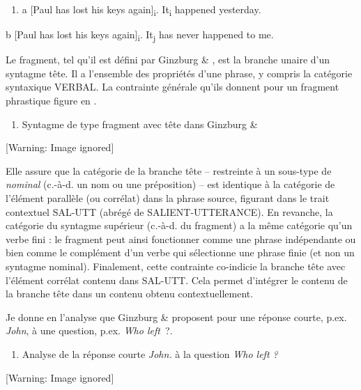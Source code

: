 \begin{enumerate}
\item \label{bkm:Ref290586096}a  [Paul has lost his keys again]\textsubscript{i}. It\textsubscript{i} happened yesterday. 


\end{enumerate}
  b  [Paul has lost his keys again]\textsubscript{i}. It\textsubscript{j} has never happened to me.  

Le fragment, tel qu'il est défini par Ginzburg \& \citet{Sag2000}, est la branche unaire d'un syntagme tête. Il a l'ensemble des propriétés d'une phrase, y compris la catégorie syntaxique VERBAL. La contrainte générale qu'ils donnent pour un fragment phrastique figure en .


\begin{enumerate}
\item \label{bkm:Ref299891853}Syntagme de type fragment avec tête dans Ginzburg \& \citet{Sag2000}


\end{enumerate}
  [Warning: Image ignored] %
 

Elle assure que la catégorie de la branche tête -- restreinte à un sous-type de \textit{nominal} (c.-à-d. un nom ou une préposition) -- est identique à la catégorie de l'élément parallèle (ou corrélat) dans la phrase source, figurant dans le trait contextuel SAL-UTT (abrégé de SALIENT-UTTERANCE). En revanche, la catégorie du syntagme supérieur (c.-à-d. du fragment) a la même catégorie qu'un verbe fini : le fragment peut ainsi fonctionner comme une phrase indépendante ou bien comme le complément d'un verbe qui sélectionne une phrase finie (et non un syntagme nominal). Finalement, cette contrainte co-indicie la branche tête avec l'élément corrélat contenu dans SAL-UTT. Cela permet d'intégrer le contenu de la branche tête dans un contenu obtenu contextuellement. 

Je donne en  l'analyse que Ginzburg \& \citet{Sag2000} proposent pour une réponse courte, p.ex. \textit{John}, à une question, p.ex. \textit{Who left~}?. 


\begin{enumerate}
\item \label{bkm:Ref299901030}Analyse de la réponse courte \textit{John.} à la question \textit{Who left ?} 


\end{enumerate}
{   [Warning: Image ignored] %
} 

